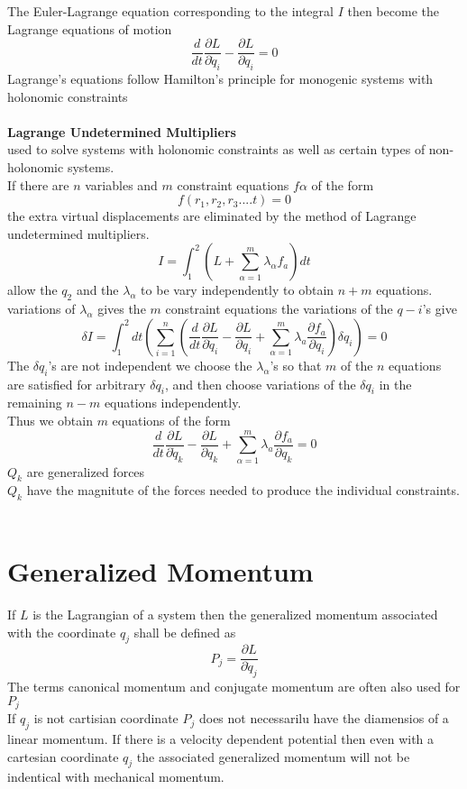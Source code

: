 The Euler-Lagrange equation corresponding to the integral $I$ then become the Lagrange equations of motion 
$$\frac{d}{d t} \frac{\partial L}{\partial \dot{q}_{i}}-\frac{\partial L}{\partial q_{i}}=0$$
Lagrange's equations follow Hamilton's principle for monogenic systems with holonomic constraints \\\\
\textbf{Lagrange Undetermined Multipliers}\\
used to solve systems with holonomic constraints as well as certain types of non-holonomic systems. \\
If there are $n$ variables and $m$ constraint equations $f\alpha$ of the form
$$f(r_1,r_2,r_3....t)=0$$
the extra virtual displacements are eliminated by the method of Lagrange undetermined multipliers.
$$I=\int_{1}^{2}\left(L+\sum_{\alpha=1}^{m} \lambda_{\alpha} f_{a}\right) d t$$
allow the $q_2$ and the $\lambda_\alpha$ to be vary independently to obtain $n+m$ equations.\\
variations of $\lambda_\alpha$ gives the $m$ constraint equations the variations of the $q-i$'s give
$$\delta I=\int_{1}^{2} d t\left(\sum_{i=1}^{n}\left(\frac{d}{d t} \frac{\partial L}{\partial \dot{q}_{i}}-\frac{\partial L}{\partial q_{i}}+\sum_{\alpha=1}^{m} \lambda_{a} \frac{\partial f_{a}}{\partial q_{i}}\right) \delta q_{i}\right)=0$$
The $\delta q_i$'s are not independent we choose the $\lambda_{\alpha}$'s so that $m$ of the $n$ equations are satisfied for arbitrary $\delta q_i$, and then choose variations of the $\delta q_i$ in the remaining $n-m$ equations independently.\\
Thus we obtain $m$ equations of the form
$$\frac{d}{d t} \frac{\partial L}{\partial \dot{q}_{k}}-\frac{\partial L}{\partial q_{k}}+\sum_{\alpha=1}^{m} \lambda_{a} \frac{\partial f_{a}}{\partial q_{k}}=0$$
$Q_k$ are generalized forces\\
$Q_k$ have the magnitute of the forces needed to produce the individual constraints.\\\\
\section{Generalized Momentum}
If $L$ is the Lagrangian of a system then the generalized momentum associated with the coordinate $q_j$ shall be defined as
$$P_j=\frac{\partial L}{\partial \dot{q}_j}$$
The terms canonical momentum and conjugate momentum are often also used for $P_j$\\
If $q_j$ is not cartisian coordinate $P_j$ does not necessarilu have the diamensios of a linear momentum. If there is a velocity dependent potential then even with a cartesian coordinate $q_j$ the associated generalized momentum will not be indentical with mechanical momentum.
